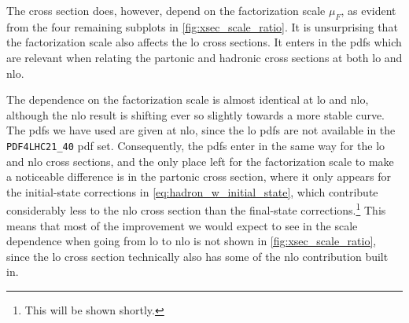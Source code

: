 The cross section does, however, depend on the factorization scale $\mu_F$, as evident from the four remaining subplots in \cref{fig:xsec_scale_ratio}.
It is unsurprising that the factorization scale also affects the \gls{lo} cross sections. It enters in the \glspl{pdf} which are relevant when relating the partonic and hadronic cross sections at both \gls{lo} and \gls{nlo}.


The dependence on the factorization scale is almost identical at \gls{lo} and \gls{nlo}, although the \gls{nlo} result is shifting ever so slightly towards a more stable curve.
The \glspl{pdf} we have used are given at \gls{nlo}, since the \gls{lo} \glspl{pdf} are not available in the \texttt{PDF4LHC21\_40} \gls{pdf} set.
Consequently, the \glspl{pdf} enter in the same way for the \gls{lo} and \gls{nlo} cross sections, and the only place left for the factorization scale to make a noticeable difference is in the partonic cross section, where it only appears for the initial-state corrections in \cref{eq:hadron_w_initial_state}, which contribute considerably less to the \gls{nlo} cross section than the final-state corrections.\footnote{This will be shown shortly.}
This means that most of the improvement we would expect to see in the scale dependence when going from \gls{lo} to \gls{nlo} is not shown in \cref{fig:xsec_scale_ratio}, since the \gls{lo} cross section technically also has some of the \gls{nlo} contribution built in.


